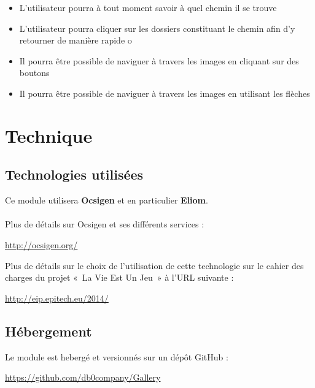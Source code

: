 \documentclass{life-fr}
\begin{document}
\begin{itemize}
  \item L'utilisateur pourra à tout moment savoir à quel chemin il se trouve
  \item L'utilisateur pourra cliquer sur les dossiers constituant le chemin
    afin d'y retourner de manière rapide
o\end{itemize}
\begin{itemize}
  \item Il pourra être possible de naviguer à travers les images en cliquant
    sur des boutons
  \item Il pourra être possible de naviguer à travers les images en utilisant
    les flèches
\end{itemize}


\chapter{Technique}

\section{Technologies utilisées}

Ce module utilisera \textbf{Ocsigen} et en particulier \textbf{Eliom}.\\
\\
Plus de détails sur Ocsigen et ses différents services :
\begin{center}
  \url{http://ocsigen.org/}
\end{center}

Plus de détails sur le choix de l'utilisation de cette technologie sur
le cahier des charges du projet «~La Vie Est Un Jeu~» à l'URL suivante :\\
\begin{center}
  \url{http://eip.epitech.eu/2014/}
\end{center}

\section{Hébergement}

Le module est hebergé et versionnés sur un dépôt GitHub :

\begin{center}
  \url{https://github.com/db0company/Gallery}
\end{center}
\end{document}
